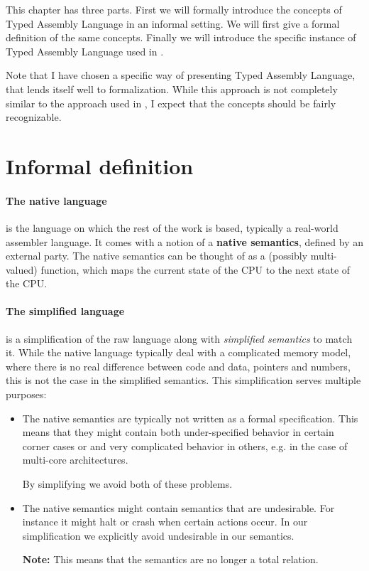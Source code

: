 This chapter has three parts. First we will formally introduce the concepts of
Typed Assembly Language in an informal setting. We will first give a formal
definition of the same concepts. Finally we will introduce the specific instance
of Typed Assembly Language used in \cite{STAL}.

Note that I have chosen a specific way of presenting Typed Assembly Language,
that lends itself well to formalization. While this approach is not completely
similar to the approach used in \cite{STAL}, I expect that the concepts should
be fairly recognizable.

\section{Informal definition}
\paragraph{The native language} is the language on which the rest of the work is
based, typically a real-world assembler language. It comes with a notion of a
\textbf{native semantics}, defined by an external party. The native semantics
can be thought of as a (possibly multi-valued) function, which maps the current
state of the CPU to the next state of the CPU.

\paragraph{The simplified language} is a simplification of the raw language
along with \emph{simplified semantics} to match it. While the native language
typically deal with a complicated memory model, where there is no real
difference between code and data, pointers and numbers, this is not the case in
the simplified semantics. This simplification serves multiple purposes:

\begin{itemize}
\item The native semantics are typically not written as a formal
  specification. This means that they might contain both under-specified
  behavior in certain corner cases or and very complicated behavior in others,
  e.g. in the case of multi-core architectures.

  By simplifying we avoid both of these problems.
\item The native semantics might contain semantics that are undesirable. For
  instance it might halt or crash when certain actions occur. In our
  simplification we explicitly avoid undesirable in our semantics.

  \textbf{Note:} This means that the semantics are no longer a total relation.
\end{itemize}

